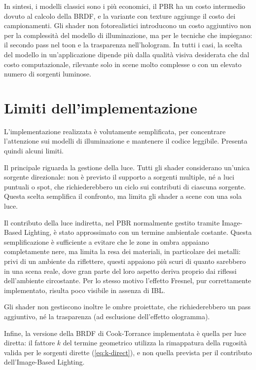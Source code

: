 \documentclass[12pt,a4paper,twoside]{book}
\begin{document}
In sintesi, i modelli classici sono i più economici, il PBR ha un costo intermedio dovuto al calcolo della BRDF, e la variante con texture aggiunge il costo dei campionamenti. Gli shader non fotorealistici introducono un costo aggiuntivo non per la complessità del modello di illuminazione, ma per le tecniche che impiegano: il secondo pass nel toon e la trasparenza nell'hologram. In tutti i casi, la scelta del modello in un'applicazione dipende più dalla qualità visiva desiderata che dal costo computazionale, rilevante solo in scene molto complesse o con un elevato numero di sorgenti luminose.

\section{Limiti dell'implementazione}
\label{sec:limiti-impl}

L'implementazione realizzata è volutamente semplificata, per concentrare l'attenzione sui modelli di illuminazione e mantenere il codice leggibile. Presenta quindi alcuni limiti.

Il principale riguarda la gestione della luce. Tutti gli shader considerano un'unica sorgente direzionale: non è previsto il supporto a sorgenti multiple, né a luci puntuali o spot, che richiederebbero un ciclo sui contributi di ciascuna sorgente. Questa scelta semplifica il confronto, ma limita gli shader a scene con una sola luce.

Il contributo della luce indiretta, nel PBR normalmente gestito tramite Image-Based Lighting, è stato approssimato con un termine ambientale costante. Questa semplificazione è sufficiente a evitare che le zone in ombra appaiano completamente nere, ma limita la resa dei materiali, in particolare dei metalli: privi di un ambiente da riflettere, questi appaiono più scuri di quanto sarebbero in una scena reale, dove gran parte del loro aspetto deriva proprio dai riflessi dell'ambiente circostante. Per lo stesso motivo l'effetto Fresnel, pur correttamente implementato, risulta poco visibile in assenza di IBL.

Gli shader non gestiscono inoltre le ombre proiettate, che richiederebbero un pass aggiuntivo, né la trasparenza (ad esclusione dell'effetto ologramma).

Infine, la versione della BRDF di Cook-Torrance implementata è quella per luce diretta: il fattore $k$ del termine geometrico utilizza la rimappatura della rugosità valida per le sorgenti dirette (\cref{eq:k-direct}), e non quella prevista per il contributo dell'Image-Based Lighting.
\end{document}
